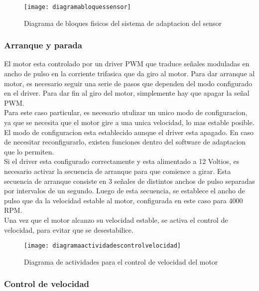 \begin{figure}[h]
  \centering
  \texttt{[image: diagramabloquessensor]}
  \caption{Diagrama de bloques fisicos del sistema de adaptacion del sensor}\label{fig:diagramabloquessensor}
\end{figure}

\subsubsection{Arranque y parada} %
\label{it6:ssub:arranque_y_parada}

El motor esta controlado por un driver PWM que traduce señales moduladas en ancho de pulso en la corriente trifasica que da giro al motor. Para dar arranque al motor, es necesario seguir una serie de pasos que dependen del modo configurado en el driver. Para dar fin al giro del motor, simplemente hay que apagar la señal PWM. \\

Para este caso particular, es necesario utulizar un unico modo de configuracion, ya que se necesita que el motor gire a una unica velocidad, lo mas estable posible. El modo de configuracion esta establecido aunque el driver esta apagado. En caso de necesitar reconfigurarlo, existen funciones dentro del software de adaptacion que lo permiten. \\

Si el driver esta configurado correctamente y esta alimentado a 12 Voltios, es necesario activar la secuencia de arranque para que comience a girar. Esta secuencia de arranque consiste en 3 señales de distintos anchos de pulso separadas por intervalos de un segundo. Luego de esta secuencia, se establece el ancho de pulso que da la velocidad estable al motor, configurada en este caso para 4000 RPM. \\

Una vez que el motor alcanzo su velocidad estable, se activa el control de velocidad, para evitar que se desestabilice. 

\begin{figure}[h]
  \centering
  \texttt{[image: diagramaactividadescontrolvelocidad]}
  \caption{Diagrama de actividades para el control de velocidad del motor}\label{fig:diagramaactividadescontrolvelocidad}
\end{figure}


\subsubsection{Control de velocidad} %
\label{it6:ssub:control_de_velocidad}

